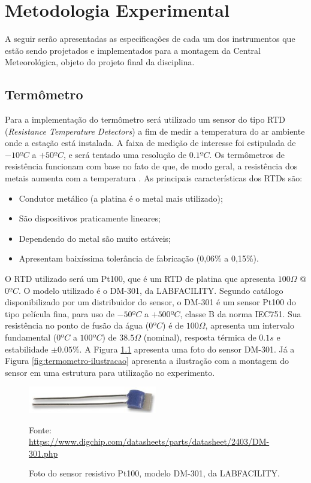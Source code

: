 \documentclass[a4paper]{instrumentacao}
\begin{document}
\chapter{Metodologia Experimental}
A seguir serão apresentadas as especificações de cada um dos instrumentos que estão sendo projetados e implementados para a montagem da Central Meteorológica, objeto do projeto final da disciplina.

\section{Termômetro}
Para a implementação do termômetro será utilizado um sensor do tipo RTD (\textit{Resistance Temperature Detectors}) a fim de medir a temperatura do ar ambiente onde a estação está instalada. A faixa de medição de interesse foi estipulada de $-10ºC$ a $+50ºC$, e será tentado uma resolução de $0.1ºC$. Os termômetros de resistência funcionam com base no fato de que, de modo geral, a resistência dos metais aumenta com a temperatura \cite{livro-texto}. As principais características dos RTDs são:

\begin{itemize}
	\item Condutor metálico (a platina é o metal mais utilizado);
	\item São dispositivos praticamente lineares;
	\item Dependendo do metal são muito estáveis;
	\item Apresentam baixíssima tolerância de fabricação (0,06\% a 0,15\%).
\end{itemize}

O RTD utilizado será um Pt100, que é um RTD de platina que apresenta $100\Omega$ @ $0ºC$. O modelo utilizado é o DM-301, da LABFACILITY. Segundo catálogo \cite{catalogo-pt100} disponibilizado por um distribuidor do sensor, o DM-301 é um sensor Pt100 do tipo película fina, para uso de $-50ºC$ a $+500ºC$, classe B da norma IEC751. Sua resistência no ponto de fusão da água ($0ºC$) é de $100\Omega$, apresenta um intervalo fundamental ($0ºC$ a $100ºC$) de $38.5\Omega$ (nominal), resposta térmica de $0.1s$ e estabilidade $\pm 0.05\%$. A Figura \ref{fig:DM-301} apresenta uma foto do sensor DM-301. Já a Figura \ref{fig:termometro-ilustracao} apresenta a ilustração com a montagem do sensor em uma estrutura para utilização no experimento.

\begin{figure}[H]
	\centering \includegraphics[width=0.5\textwidth]{DM-301.jpg}
	\caption{Foto do sensor resistivo Pt100, modelo DM-301, da LABFACILITY.}
	Fonte: \url{https://www.digchip.com/datasheets/parts/datasheet/2403/DM-301.php}
	\label{fig:DM-301}
\end{figure}
\end{document}
